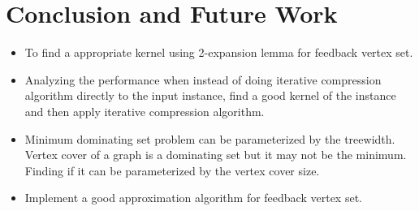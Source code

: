\chapter{Conclusion and Future Work}

\begin{itemize}
    \item To find a appropriate kernel using 2-expansion lemma for feedback vertex set.
    \item Analyzing the performance when 
    instead of doing iterative compression algorithm directly to the input instance, 
    find a good kernel of the instance and then apply iterative compression algorithm.
    \item Minimum dominating set problem can be parameterized by the treewidth. 
    Vertex cover of a graph is a dominating set but it may not be the minimum. Finding 
    if it can be parameterized by the vertex cover size.
    \item Implement a good approximation algorithm for feedback vertex set.
\end{itemize}






